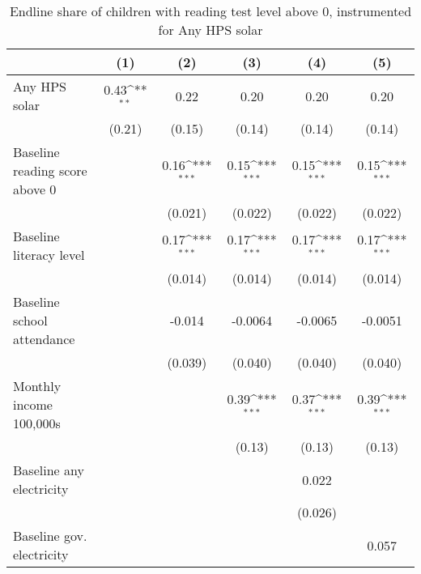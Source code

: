 \begin{table}[htbp]\centering
\def\sym#1{\ifmmode^{#1}\else\(^{#1}\)\fi}
\caption{Endline share of children with reading test level above 0, instrumented for Any HPS solar}
\begin{tabular*}{1\hsize}{@{\hskip\tabcolsep\extracolsep\fill}l*{5}{c}}
\toprule
                &\multicolumn{1}{c}{(1)}         &\multicolumn{1}{c}{(2)}         &\multicolumn{1}{c}{(3)}         &\multicolumn{1}{c}{(4)}         &\multicolumn{1}{c}{(5)}         \\
\midrule
Any HPS solar   &     0.43\sym{**} &     0.22         &     0.20         &     0.20         &     0.20         \\
                &   (0.21)         &   (0.15)         &   (0.14)         &   (0.14)         &   (0.14)         \\
Baseline reading score above 0&                  &     0.16\sym{***}&     0.15\sym{***}&     0.15\sym{***}&     0.15\sym{***}\\
                &                  &  (0.021)         &  (0.022)         &  (0.022)         &  (0.022)         \\
Baseline literacy level&                  &     0.17\sym{***}&     0.17\sym{***}&     0.17\sym{***}&     0.17\sym{***}\\
                &                  &  (0.014)         &  (0.014)         &  (0.014)         &  (0.014)         \\
Baseline school attendance&                  &   -0.014         &  -0.0064         &  -0.0065         &  -0.0051         \\
                &                  &  (0.039)         &  (0.040)         &  (0.040)         &  (0.040)         \\
Monthly income 100,000s&                  &                  &     0.39\sym{***}&     0.37\sym{***}&     0.39\sym{***}\\
                &                  &                  &   (0.13)         &   (0.13)         &   (0.13)         \\
Baseline any electricity&                  &                  &                  &    0.022         &                  \\
                &                  &                  &                  &  (0.026)         &                  \\
Baseline gov. electricity&                  &                  &                  &                  &    0.057         \\

\end{tabular*}
\end{table}
